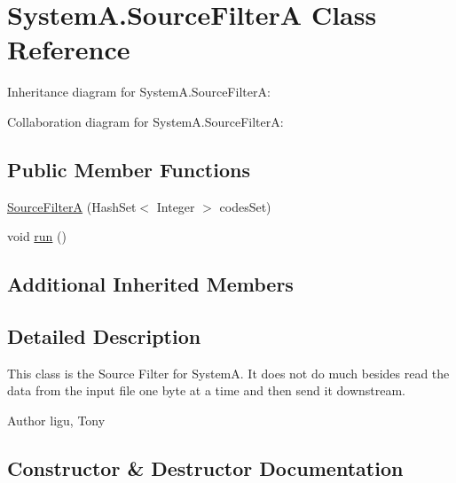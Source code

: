 \hypertarget{class_system_a_1_1_source_filter_a}{}\section{System\+A.\+Source\+Filter\+A Class Reference}
\label{class_system_a_1_1_source_filter_a}


Inheritance diagram for System\+A.\+Source\+Filter\+A\+:


Collaboration diagram for System\+A.\+Source\+Filter\+A\+:
\subsection*{Public Member Functions}
\begin{DoxyCompactItemize}
\item 
\hyperlink{class_system_a_1_1_source_filter_a_a8cca3e9d326c13986c466b5e6dc3c148}{Source\+Filter\+A} (Hash\+Set$<$ Integer $>$ codes\+Set)
\item 
void \hyperlink{class_system_a_1_1_source_filter_a_a8fbf98238a85ec30488c9117819df20b}{run} ()
\end{DoxyCompactItemize}
\subsection*{Additional Inherited Members}


\subsection{Detailed Description}
This class is the Source Filter for System\+A. It does not do much besides read the data from the input file one byte at a time and then send it downstream. \begin{DoxyAuthor}{Author}
ligu, Tony 
\end{DoxyAuthor}


\subsection{Constructor \& Destructor Documentation}
\hypertarget{class_system_a_1_1_source_filter_a_a8cca3e9d326c13986c466b5e6dc3c148}{}
